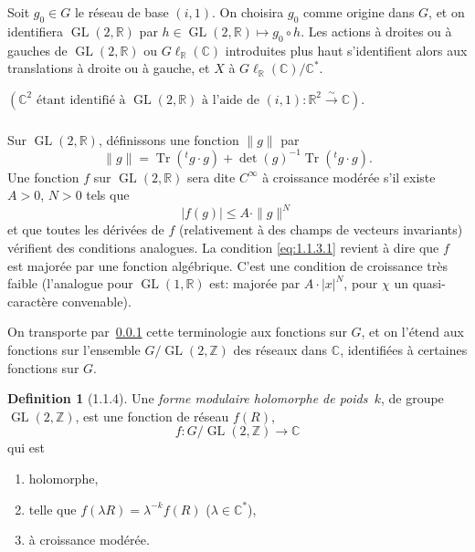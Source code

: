 \documentclass[11pt,a4paper]{amsart}
\theoremstyle{plain}
\theoremstyle{definition}
\newtheorem{definition}[theorem]{Definition}
\theoremstyle{remark}
\DeclareMathOperator{\GL}{GL}
\DeclareMathOperator{\Tr}{Tr}
\newcommand{\ZZ}{\mathbb{Z}}
\newcommand{\RR}{\mathbb{R}}
\newcommand{\CC}{\mathbb{C}}
\begin{document}
\subsubsection{}
\label{sec:1.1.2}

Soit $g_0 \in G$ le r\'eseau de base $(i, 1)$. On choisira $g_0$ comme origine dans $G$, et on identifiera $\GL(2,\RR)$ par $h \in \GL(2,\RR) \mapsto g_0 \circ h$. Les actions \`a droites ou \`a gauches de $\GL(2,\RR)$ ou $G\ell_{\RR}(\CC)$ introduites plus haut s'identifient alors aux translations \`a droite ou \`a gauche, et $X$ \`a $G\ell_{\RR}(\CC)/\CC^*$.

$(\CC^2 \text{ \'etant identifi\'e \`a } \GL(2,\RR) \text{ \`a l'aide de } (i,1): \RR^2 \xrightarrow{\sim} \CC)$.

\subsubsection{}
\label{sec:1.1.3}

Sur $\GL(2,\RR)$, d\'efinissons une fonction $\|g\|$ par
\[ \|g\| = \Tr({}^t\!g \cdot g) + \det(g)^{-1}\Tr({}^t\!g \cdot g). \]
Une fonction $f$ sur $\GL(2,\RR)$ sera dite $C^\infty$ \`a croissance mod\'er\'ee s'il existe $A > 0$, $N > 0$ tels que
\begin{equation} \label{eq:1.1.3.1}
|f(g)| \leq A \cdot \|g\|^N
\end{equation}
et que toutes les d\'eriv\'ees de $f$ (relativement \`a des champs de vecteurs invariants) v\'erifient des conditions analogues. La condition \eqref{eq:1.1.3.1} revient \`a dire que $f$ est major\'ee par une fonction alg\'ebrique. C'est une condition de croissance tr\`es faible (l'analogue pour $\GL(1,\RR)$ est: major\'ee par $A \cdot |x|^N$, pour $\chi$ un quasi-caract\`ere convenable).

On transporte par~\ref{sec:1.1.2} cette terminologie aux fonctions sur $G$, et on l'\'etend aux fonctions sur l'ensemble $G/\GL(2,\ZZ)$ des r\'eseaux dans $\CC$, identifi\'ees \`a certaines fonctions sur $G$.

\begin{definition}[1.1.4] \label{def:1.1.4}
Une \emph{forme modulaire holomorphe de poids~$k$}, de groupe $\GL(2,\ZZ)$, est une fonction de r\'eseau $f(R)$,
\[ f: G/\GL(2,\ZZ) \longrightarrow \CC \]
qui est
\begin{enumerate}
\item[(a)] holomorphe,
\item[(b)] telle que $f(\lambda R) = \lambda^{-k} f(R)$ ($\lambda \in \CC^*$),
\item[(c)] \`a croissance mod\'er\'ee.
\end{enumerate}
\end{definition}
\end{document}
